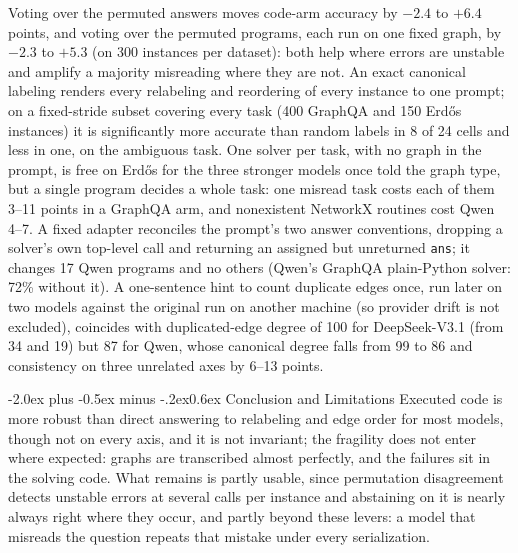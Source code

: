 \documentclass[11pt]{article}
\makeatletter
\renewcommand\section{\@startsection{section}{1}{\z@}
  {-2.0ex plus -0.5ex minus -.2ex}{0.6ex}
  {\large\bfseries\centering}}
\makeatother
\begin{document}
Voting over the permuted answers moves code-arm accuracy by $-2.4$ to $+6.4$ points,
and voting over the permuted programs, each run on one fixed graph, by $-2.3$ to
$+5.3$ (on 300 instances per dataset): both help where errors are unstable and
amplify a majority misreading where they are not. An exact canonical labeling
renders every relabeling and reordering of every instance to one prompt; on a
fixed-stride subset covering every task (400 GraphQA and 150 Erd\H{o}s instances)
it is significantly more accurate than random labels in 8 of 24 cells and less in
one, on the ambiguous task. One solver per task, with no graph in the prompt, is free
on Erd\H{o}s for the three stronger models once told the graph type, but a single
program decides a whole task: one misread task costs each of them 3--11 points in a
GraphQA arm, and nonexistent NetworkX routines cost Qwen 4--7. A fixed adapter
reconciles the prompt's two answer conventions, dropping a solver's own top-level
call and returning an assigned but unreturned \texttt{ans}; it changes 17 Qwen
programs and no others (Qwen's GraphQA plain-Python solver: 72\% without it). A
one-sentence hint to count duplicate edges once, run later on two models against
the original run on another machine (so provider drift is not excluded), coincides
with duplicated-edge degree of 100 for DeepSeek-V3.1 (from 34 and 19) but 87 for
Qwen, whose canonical degree falls from 99 to 86 and consistency on three unrelated
axes by 6--13 points.

\section{Conclusion and Limitations}
\label{sec:conclusion}
Executed code is more robust than direct answering to relabeling and edge order for
most models, though not on every axis, and it is not invariant; the fragility does not enter
where expected: graphs are transcribed
almost perfectly, and the failures sit in the solving code. What remains is partly usable,
since permutation disagreement detects unstable errors at several calls per instance and
abstaining on it is nearly always right where they occur, and partly beyond these
levers: a model that misreads the question repeats that mistake under every
serialization.
\end{document}
